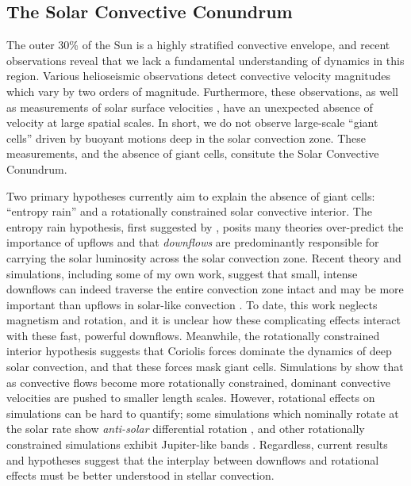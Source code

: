 \subsection{The Solar Convective Conundrum}
\label{sct:convective_conundrum}
The outer 30\% of the Sun is a highly stratified convective envelope, and recent observations reveal that we lack a fundamental understanding of dynamics in this region.
Various helioseismic observations \citep{hanasoge&all2012, greer&all2015} detect convective velocity magnitudes which vary by two orders of magnitude.
Furthermore, these observations, as well as measurements of solar surface velocities \citep{hathaway&all2015}, have an unexpected absence of velocity at large spatial scales.
In short, we do not observe large-scale ``giant cells'' driven by buoyant motions deep in the solar convection zone.
These measurements, and the absence of giant cells, consitute the Solar Convective Conundrum.

Two primary hypotheses currently aim to explain the absence of giant cells: ``entropy rain'' and a rotationally constrained solar convective interior.
The entropy rain hypothesis, first suggested by \cite{spruit1997}, posits many theories over-predict the importance of upflows and that \emph{downflows} are predominantly responsible for carrying the solar luminosity across the solar convection zone.
Recent theory and simulations, including some of my own work, suggest that small, intense downflows can indeed traverse the entire convection zone intact and may be more important than upflows in solar-like convection \citep{brandenburg2016, kapyla&all2017, andersLB2019}.
To date, this work neglects magnetism and rotation, and it is unclear how these complicating effects interact with these fast, powerful downflows.
Meanwhile, the rotationally constrained interior hypothesis suggests that Coriolis forces dominate the dynamics of deep solar convection, and that these forces mask giant cells.
Simulations by \cite{featherstone&hindman2016} show that as convective flows become more rotationally constrained, dominant convective velocities are pushed to smaller length scales.
However, rotational effects on simulations can be hard to quantify; some simulations which nominally rotate at the solar rate show \emph{anti-solar} differential rotation \citep{gastine&all2014}, and other rotationally constrained simulations exhibit Jupiter-like bands \citep{brun&all2017}.
Regardless, current results and hypotheses suggest that the interplay between downflows and rotational effects must be better understood in stellar convection.

